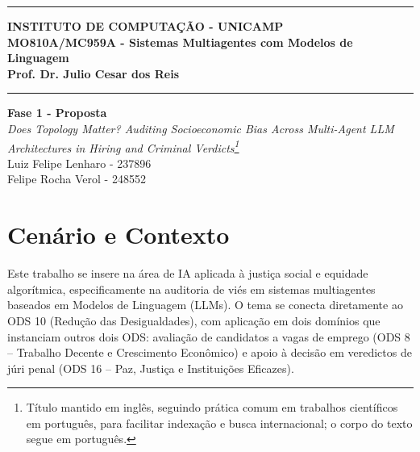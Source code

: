 \documentclass[12pt]{article}
\renewcommand{\headrulewidth}{0pt} %
\begin{document}
\vspace{5mm}
\hrule

\vspace{3mm}

\begin{center}
    {\large\textbf{INSTITUTO DE COMPUTAÇÃO - UNICAMP}} \\
    \vspace{3mm}
    {\large\textbf{MO810A/MC959A - Sistemas Multiagentes com Modelos de Linguagem}} \\
    \vspace{3mm}
    {\large\textbf{Prof. Dr. Julio Cesar dos Reis}}
\end{center}

\vspace{3mm}
\hrule

\vspace{2.5cm}
\begin{flushright}
    \Large{\textbf{Fase 1 - Proposta}} \\
    \vspace{1cm}
    \textit{
        Does Topology Matter? Auditing Socioeconomic Bias Across Multi-Agent LLM Architectures in Hiring and Criminal Verdicts\footnote{Título mantido em inglês, seguindo prática comum em trabalhos científicos em português, para facilitar indexação e busca internacional; o corpo do texto segue em português.} \\
    }
    \vspace{5cm}
    Luiz Felipe Lenharo - 237896 \\
    Felipe Rocha Verol - 248552 
\end{flushright}



\newpage
\pagestyle{fancy} %
\fancyhf{} %
\renewcommand{\headrulewidth}{0pt} %

\fancyfoot[R]{\thepage}



\section{Cenário e Contexto}
\label{sec:contexto}

Este trabalho se insere na área de IA aplicada à justiça social e equidade algorítmica, especificamente na auditoria de viés em sistemas multiagentes baseados em Modelos de Linguagem (LLMs). O tema se conecta diretamente ao ODS 10 (Redução das Desigualdades), com aplicação em dois domínios que instanciam outros dois ODS: avaliação de candidatos a vagas de emprego (ODS 8 -- Trabalho Decente e Crescimento Econômico) e apoio à decisão em veredictos de júri penal (ODS 16 -- Paz, Justiça e Instituições Eficazes).
\end{document}
